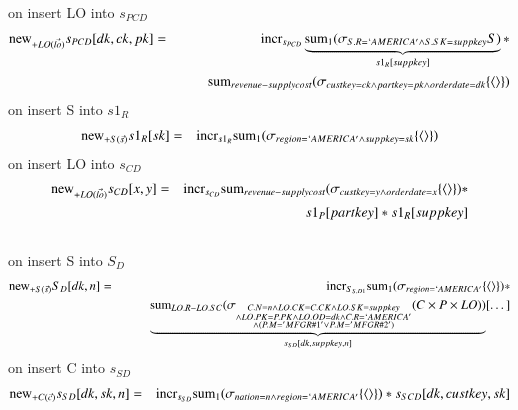 on insert LO into $s_{PCD}$
\begin{eqnarray}
\mathrm{new}_{+LO(\vec{lo})} s_{PCD} [dk,ck,pk] &=&
\mathrm{incr}_{s_{PCD}}  \underbrace{\mathrm{sum}_{1} (\sigma_{S.R = `AMERICA' \wedge S.SK = suppkey}S)}_{s1_{R}[suppkey]} * 
\\\nonumber&&\qquad
\mathrm{sum}_{revenue-supplycost} (\sigma_{custkey = ck \wedge partkey = pk \wedge orderdate = dk} \{{\langle\rangle}\})
\end{eqnarray}
on insert S into $s1_{R}$
\begin{eqnarray}
\mathrm{new}_{+S(\vec{s})} s1_{R} [sk] &= &
\mathrm{incr}_{s1_{R}} \mathrm{sum}_{1} (\sigma_{region = `AMERICA' \wedge suppkey = sk} \{{\langle\rangle}\})
\end{eqnarray}
on insert LO into $s_{CD}$
\begin{eqnarray}
\mathrm{new}_{+LO(\vec{lo})} s_{CD} [x,y] &=&
\mathrm{incr}_{s_{CD}} \mathrm{sum}_{revenue-supplycost} (\sigma_{custkey = y \wedge orderdate = x} \{{\langle\rangle}\} ) *
\\\nonumber&& \qquad
s1_{P} [partkey] * s1_{R} [suppkey]
\end{eqnarray}
\\
on insert S into $S_{D}$
\begin{eqnarray}
\mathrm{new}_{+S(\vec{s})} S_{D} [dk, n] &=& \mathrm{incr}_{S_{S, D1}}
\mathrm{sum}_{1} (\sigma_{region = `AMERICA'} \{{\langle\rangle}\}) *   
\\\nonumber&& \qquad 
\underbrace{ \mathrm{sum}_{LO.R - LO.SC}( \sigma_{\substack{ C.N = n \wedge LO.CK = C.CK \wedge LO.SK = suppkey \\\wedge LO.PK = P.PK \wedge LO.OD = dk \wedge C.R = `AMERICA' \\\wedge ( P.M = 'MFGR\#1' \vee P.M = 'MFGR\#2')
}} ( C \times P \times LO ))}_{s_{SD}[dk, suppkey, n]} [\dots]\\
\end{eqnarray}
on insert C into $s_{SD}$
\begin{eqnarray}
\mathrm{new}_{+C (\vec{c })} s_{SD} [dk, sk, n ] &=& \mathrm{incr}_{s_{SD }}
\mathrm{sum}_{1} (\sigma_{nation = n \wedge region = `AMERICA'} \{{\langle\rangle}\}) * s_{SCD}[dk, custkey, sk]
\end{eqnarray}
